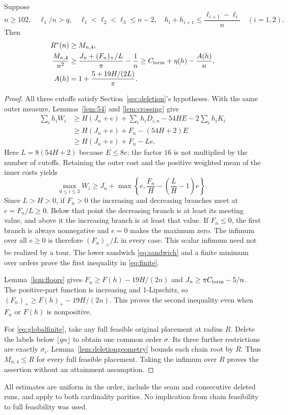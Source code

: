 \documentclass[review,supplement,hidelinks,onefignum,onetabnum]{siamart251216}
\newcommand{\Rstar}{R^*}
\newcommand{\Cterm}{C_{\rm term}}
\begin{document}
\begin{proposition}\label{prop:finite}
Suppose
\begin{equation}\label{eq:finitegates}
n\ge102,\quad \ell_1/n>q,\quad
\ell_1<\ell_2<\ell_3\le n-2,\quad
h_i+h_{i+1}\le\frac{\ell_{i+1}-\ell_i}{n}\quad(i=1,2).
\end{equation}
Then
\begin{align}
\Rstar(n)&\ge M_{n,4},\label{eq:globalfinite}\\
\frac{M_{n,4}}{n^2}&\ge\frac{J_n+(F_n)_+/L}{\pi}-\frac1n
\ge\Cterm+\eta(h)-\frac{A(h)}n,\label{eq:finite}\\
A(h)&=1+\frac{5+19H/(2L)}\pi.\nonumber
\end{align}
\end{proposition}
\begin{proof}
All three cutoffs satisfy Section~\ref{sec:deletion}'s hypotheses. With
the same outer measure, Lemmas~\ref{lem:54} and \ref{lem:crossing} give
\begin{align*}
\sum_i h_iW_i
&\ge H(J_n+e)+\sum_i h_iD_{i,n}-54HE-2\sum_i h_iK_i\\
&\ge H(J_n+e)+F_n-(54H+2)E\\
&\ge H(J_n+e)+F_n-Le.
\end{align*}
Here $L=8(54H+2)$ because $E\le8e$; the factor $16$ is not
multiplied by the number of cutoffs. Retaining the outer cost and the
positive weighted mean of the inner costs yields
\[
\max_{0\le i\le3}W_i\ge J_n+
\max\left\{e,\frac{F_n}{H}-\left(\frac LH-1\right)e\right\}.
\]
Since $L>H>0$, if $F_n>0$ the increasing and decreasing branches meet
at $e=F_n/L\ge0$. Below that point the decreasing branch is at least
its meeting value, and above it the increasing branch is at least that
value. If $F_n\le0$, the first branch is always nonnegative and $e=0$
makes the maximum zero. The infimum over all $e\ge0$ is therefore
$(F_n)_+/L$ in every case. This scalar infimum need not be realized by
a tour. The lower sandwich \eqref{eq:sandwich} and a finite minimum
over orders prove the first inequality in \eqref{eq:finite}.

Lemma~\ref{lem:floors} gives $F_n\ge F(h)-19H/(2n)$ and
$J_n\ge\pi\Cterm-5/n$. The positive-part function is increasing and
1-Lipschitz, so $(F_n)_+\ge F(h)_+-19H/(2n)$. This proves the second
inequality even when $F_n$ or $F(h)$ is nonpositive.

For \eqref{eq:globalfinite}, take any full feasible original placement
at radius $R$. Delete the labels below $\lfloor qn\rfloor$ to obtain
one common order $\sigma$. Its three further restrictions are exactly
$\sigma_i$. Lemma~\ref{lem:deletiongeometry} bounds each chain root by
$R$. Thus $M_{n,4}\le R$ for every full feasible placement. Taking the
infimum over $R$ proves the assertion without an attainment assumption.
\end{proof}
All estimates are uniform in the order, include the seam and consecutive
deleted runs, and apply to both cardinality parities. No implication from
chain feasibility to full feasibility was used.
\end{document}
